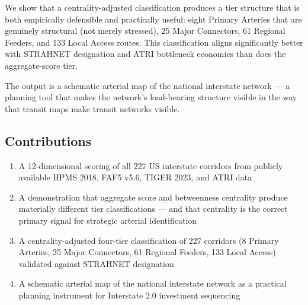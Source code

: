 We show that a centrality-adjusted classification produces a tier structure that is both empirically defensible and practically useful: eight Primary Arteries that are genuinely structural (not merely stressed), 25 Major Connectors, 61 Regional Feeders, and 133 Local Access routes. This classification aligns significantly better with STRAHNET designation and ATRI bottleneck economics than does the aggregate-score tier.

The output is a schematic arterial map of the national interstate network --- a planning tool that makes the network's load-bearing structure visible in the way that transit maps make transit networks visible.


\subsection*{Contributions}

\begin{enumerate}
\item A 12-dimensional scoring of all 227 US interstate corridors from publicly available HPMS 2018, FAF5 v5.6, TIGER 2023, and ATRI data
\item A demonstration that aggregate score and betweenness centrality produce materially different tier classifications --- and that centrality is the correct primary signal for strategic arterial identification
\item A centrality-adjusted four-tier classification of 227 corridors (8 Primary Arteries, 25 Major Connectors, 61 Regional Feeders, 133 Local Access) validated against STRAHNET designation
\item A schematic arterial map of the national interstate network as a practical planning instrument for Interstate 2.0 investment sequencing
\end{enumerate}
